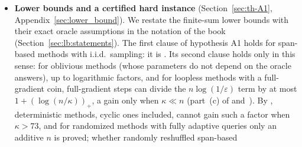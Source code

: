 \begin{itemize}[leftmargin=1.4em,itemsep=1pt,topsep=2pt]
of variables of , Proposition~\ref{prop:59} holds in a fixed metric $P$ with relative
constants (), but for $\ell_2$-regularized logistic regression no $P$ improves the global
condition number, $\kappaP\ge\kappa$ by : the gains can only be trajectory-dependent;
for $P=\hat\Sigma+\lambda I$ the trajectory bound of  sees the spectrum only through ridge
leverage scores but pays the smallest per-sample curvature, and the observed gains are accounted for only by the local
constants at the optimum of , used heuristically along the runs. With $\kappa=10^3$
(5 seeds), this statistical metric and the Hessian at the optimum (an oracle benchmark), at
$O(d^2)$ cost per iteration, raise the contraction exponent of $\norm{\theta_t-\etastar}_P^2$ from 1.00 to 1.11 per
pass for $\alpha=1$ and from 0.61 to 1.24--1.26 for $\alpha=2$, whereas the transferred bound with global constants
ranks them below the identity.
\item \textbf{Lower bounds and a certified hard instance} (Section~\ref{sec:th-A1},
Appendix~\ref{sec:lower_bound}). We restate the finite-sum lower bounds with their exact oracle assumptions in the
notation of the book (Section~\ref{sec:lb:statements}). The first clause of hypothesis A1 holds for span-based
methods with i.i.d.\ sampling: it is . Its second clause holds only in this sense: for oblivious
methods (whose parameters do not depend on the oracle answers), up to logarithmic factors, and for loopless methods
with a full-gradient coin, full-gradient steps can divide the $n\log(1/\varepsilon)$ term by at most
$1+(\log(n/\kappa))_+$, a gain only when $\kappa\ll n$ (part~(c) of  and~). By
, deterministic methods, cyclic ones included, cannot gain such a factor when $\kappa>73$, and for
randomized methods with fully adaptive queries only an additive $n$ is proved; whether randomly reshuffled span-based

\end{itemize}

